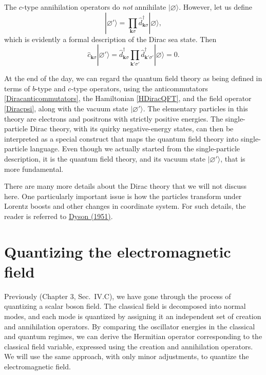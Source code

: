 \documentclass[pra,12pt]{revtex4}
\begin{document}
The $c$-type annihilation operators do \textit{not} annihilate
$|\varnothing\rangle$.  However, let us define
\begin{equation}
  |\varnothing'\rangle = \prod_{\mathbf{k}\sigma} \hat{d}_{\mathbf{k}\sigma}^\dagger
  |\varnothing\rangle,
\end{equation}
which is evidently a formal description of the Dirac sea state.  Then
\begin{equation}
  \hat{c}_{\mathbf{k}\sigma} |\varnothing'\rangle = 
  \hat{d}^\dagger_{\mathbf{k}\sigma} \prod_{\mathbf{k}'\sigma'}
  \hat{d}_{\mathbf{k}'\sigma'}^\dagger |\varnothing\rangle = 0.
\end{equation}

At the end of the day, we can regard the quantum field theory as being
defined in terms of $b$-type and $c$-type operators, using the
anticommutators \eqref{Diracanticommutators}, the Hamiltonian
\eqref{HDiracQFT}, and the field operator \eqref{Diracpsi}, along with
the vacuum state $|\varnothing'\rangle$.  The elementary particles in
this theory are electrons and positrons with strictly positive
energies.  The single-particle Dirac theory, with its quirky
negative-energy states, can then be interpreted as a special construct
that maps the quantum field theory into single-particle language.
Even though we actually started from the single-particle description,
it is the quantum field theory, and its vacuum state
$|\varnothing'\rangle$, that is more fundamental.

There are many more details about the Dirac theory that we will not
discuss here.  One particularly important issue is how the particles
transform under Lorentz boosts and other changes in coordinate system.
For such details, the reader is referred to
\hyperref[cite:dyson]{Dyson (1951)}.

\section{Quantizing the electromagnetic field}
\label{sec:em_quantization}

Previously (Chapter 3, Sec.~IV.C), we have gone through the process of
quantizing a scalar boson field.  The classical field is decomposed
into normal modes, and each mode is quantized by assigning it an
independent set of creation and annihilation operators.  By comparing
the oscillator energies in the classical and quantum regimes, we can
derive the Hermitian operator corresponding to the classical field
variable, expressed using the creation and annihilation operators.  We
will use the same approach, with only minor adjustments, to quantize
the electromagnetic field.
\end{document}
